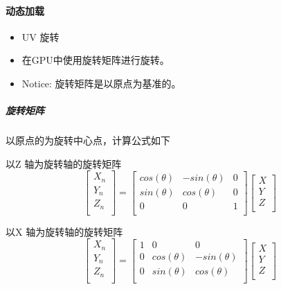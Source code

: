 \documentclass[UTF8,a4paper,12pt]{ctexbook}
\begin{document}
	 \paragraph{动态加载}
		\begin{itemize}
			\item UV 旋转
			\item 在GPU中使用旋转矩阵进行旋转。
			\item Notice: 旋转矩阵是以原点为基准的。
		\end{itemize}
		\subparagraph{旋转矩阵}以原点的为旋转中心点，计算公式如下

			以Z 轴为旋转轴的旋转矩阵
				$$
				\left[
					\begin{array}{c}
						X_n\\
						Y_n\\
						Z_n\\		
					\end{array}
				\right]	
				= \left[
					\begin{array}{ccc}
						cos(\theta) & -sin(\theta) & 0\\
						sin(\theta) & cos(\theta) & 0\\
						0 & 0 & 1\\
					\end{array}
				\right]
				\left[
					\begin{array}{c}
						X\\
						Y\\
						Z\\		
					\end{array}
				\right]	
				$$

			以X 轴为旋转轴的旋转矩阵
				$$
				\left[
				\begin{array}{c}
				X_n\\
				Y_n\\
				Z_n\\		
				\end{array}
				\right]	
				= \left[
				\begin{array}{ccc}
				1 & 0 & 0\\
				0 & cos(\theta) & -sin(\theta)\\
				0 & sin(\theta) & cos(\theta)\\
				\end{array}
				\right]
				\left[
				\begin{array}{c}
				X\\
				Y\\
				Z\\		
				\end{array}
				\right]	
				$$				
\end{document}
